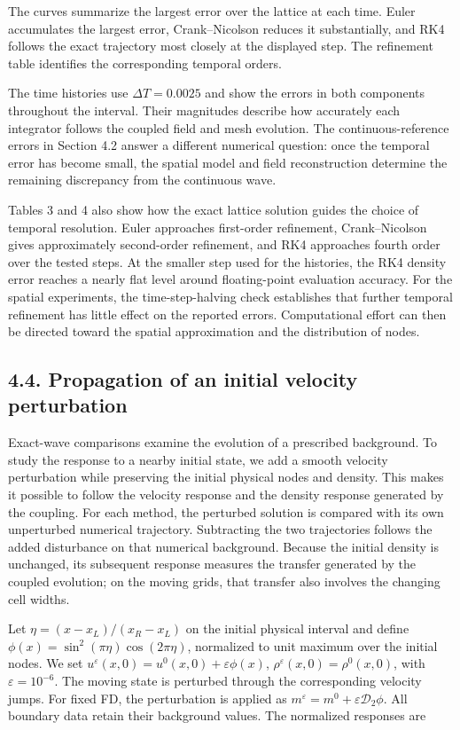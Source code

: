 \documentclass[11pt,a4paper]{article}
\begin{document}
The curves summarize the largest error over the lattice at each time. Euler accumulates the largest error, Crank–Nicolson reduces it substantially, and RK4 follows the exact trajectory most closely at the displayed step. The refinement table identifies the corresponding temporal orders.

The time histories use \(\Delta T=0.0025\) and show the errors in both components throughout the interval. Their magnitudes describe how accurately each integrator follows the coupled field and mesh evolution. The continuous-reference errors in Section 4.2 answer a different numerical question: once the temporal error has become small, the spatial model and field reconstruction determine the remaining discrepancy from the continuous wave.

Tables 3 and 4 also show how the exact lattice solution guides the choice of temporal resolution. Euler approaches first-order refinement, Crank–Nicolson gives approximately second-order refinement, and RK4 approaches fourth order over the tested steps. At the smaller step used for the histories, the RK4 density error reaches a nearly flat level around floating-point evaluation accuracy. For the spatial experiments, the time-step-halving check establishes that further temporal refinement has little effect on the reported errors. Computational effort can then be directed toward the spatial approximation and the distribution of nodes.

\FloatBarrier
\subsection*{4.4. Propagation of an initial velocity perturbation}

Exact-wave comparisons examine the evolution of a prescribed background. To study the response to a nearby initial state, we add a smooth velocity perturbation while preserving the initial physical nodes and density. This makes it possible to follow the velocity response and the density response generated by the coupling. For each method, the perturbed solution is compared with its own unperturbed numerical trajectory. Subtracting the two trajectories follows the added disturbance on that numerical background. Because the initial density is unchanged, its subsequent response measures the transfer generated by the coupled evolution; on the moving grids, that transfer also involves the changing cell widths.

Let \(\eta=(x-x_L)/(x_R-x_L)\) on the initial physical interval and define \(\phi(x)=\sin^2(\pi\eta)\cos(2\pi\eta)\), normalized to unit maximum over the initial nodes. We set \(u^\varepsilon(x,0)=u^0(x,0)+\varepsilon\phi(x)\), \(\rho^\varepsilon(x,0)=\rho^0(x,0)\), with \(\varepsilon=10^{-6}\). The moving state is perturbed through the corresponding velocity jumps. For fixed FD, the perturbation is applied as \(m^\varepsilon=m^0+\varepsilon\mathcal D_2\phi\). All boundary data retain their background values. The normalized responses are
\end{document}
